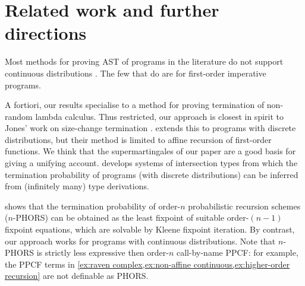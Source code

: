 \section{Related work and further directions}
\label{sec:related}

 

Most methods for proving AST of programs in the literature do not support continuous distributions \citep{DBLP:journals/toplas/LagoG19,DBLP:journals/jacm/KaminskiKMO18,DBLP:conf/lics/OlmedoKKM16,DBLP:conf/lics/KobayashiLG19,DBLP:conf/mfcs/KaminskiK15,DBLP:series/mcs/McIverM05}.
The few that do \citep{DBLP:conf/popl/FioritiH15,DBLP:conf/pldi/ChenH20,DBLP:journals/toplas/ChatterjeeFNH18} are for first-order imperative programs.

A fortiori, our results specialise to a method for proving termination of non-random lambda calculus. 
Thus restricted, our approach is closest in spirit to Jones' work on size-change termination \citep{DBLP:journals/lmcs/JonesB08,DBLP:conf/aplas/SereniJ05}. 
\cite{DBLP:journals/toplas/LagoG19} extends this to programs with discrete distributions, but their method is limited to affine recursion of first-order functions.
We think that the supermartingales of our paper are a good basis for giving a unifying account.
\cite{DBLP:conf/ppdp/BreuvartL18} develops systems of intersection types from which the termination probability of programs (with discrete distributions) can be inferred from (infinitely many) type derivations.  

\cite{DBLP:conf/lics/KobayashiLG19} shows that the termination probability of order-$n$ probabilistic recursion schemes ($n$-PHORS) can be obtained as the least fixpoint of suitable order-$(n-1)$ fixpoint equations, which are solvable by Kleene fixpoint iteration.  
By contrast, our approach works for programs with continuous distributions. 
Note that $n$-PHORS is strictly less expressive then order-$n$ call-by-name PPCF:
for example, the PPCF terms in \cref{ex:raven complex,ex:non-affine continuous,ex:higher-order recursion}
are not definable as PHORS.

